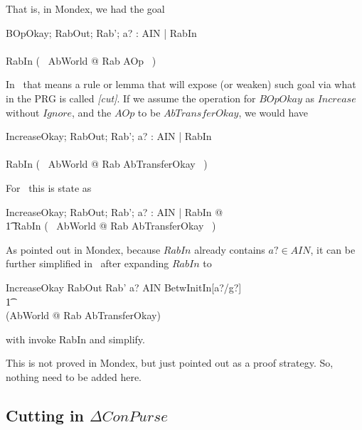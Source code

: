 That is, in Mondex, we had the goal
%
\begin{gzed}
BOpOkay; RabOut; Rab'; a? : AIN | RabIn
\\ %
\shows
\\ %
RabIn \land (~ \exists AbWorld @ Rab \land AOp ~)
\end{gzed}
%
In \zeves\ that means a rule or lemma that will expose (or weaken)
such goal via what in the PRG is called \textit{[cut]}. If we assume
the operation for $BOpOkay$ as $Increase$ without $Ignore$, and the
$AOp$ to be $AbTransferOkay$, we would have
%
\begin{gzed}
  IncreaseOkay; RabOut; Rab'; a? : AIN | RabIn
  \\ %
  \shows
  \\ %
  RabIn \land (~ \exists AbWorld @ Rab \land AbTransferOkay ~)
\end{gzed}
%
For \zeves\ this is state as
\begin{gzed}
   \forall IncreaseOkay; RabOut; Rab'; a? : AIN | RabIn @ \\
    \t1 RabIn \land (~ \exists AbWorld @ Rab \land AbTransferOkay ~)
\end{gzed}
%
As pointed out in Mondex, because $RabIn$ already contains $a? \in
AIN$, it can be further simplified in \zeves\ after expanding
$RabIn$ to
%
\begin{gzed}
  IncreaseOkay \land RabOut \land Rab' \land a? \in AIN \land BetwInitIn[a?/g?]
  \\
  \t1 \implies
  \\
  (\exists AbWorld @ Rab \land AbTransferOkay)
\end{gzed}
%
with \textsf{invoke RabIn} and \textsf{simplify}.

This is not proved in Mondex, but just pointed out as a proof
strategy. So, nothing need to be added here.


\subsection{Cutting in $\Delta ConPurse$}

